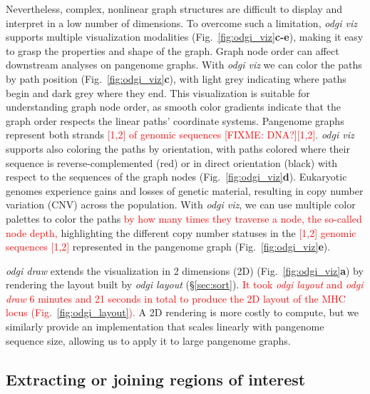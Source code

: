 \documentclass{bioinfo}
\newcommand{\red}[1]{{\textcolor{Red}{#1}}}
\newcommand{\FIXME}[1]{\red{[FIXME: #1]}}
\newcommand{\REVIEWED}[1]{{\textcolor{Red}{#1}}}
\begin{document}
Nevertheless, complex, nonlinear graph structures are difficult to display and interpret in a low number of dimensions.
To overcome such a limitation, \textit{odgi viz} supports multiple visualization modalities (Fig.~\ref{fig:odgi_viz}\textbf{c-e}), making it easy to grasp the properties and shape of the graph.
Graph node order can affect downstream analyses on pangenome graphs.
With \textit{odgi viz} we can color the paths by path position (Fig.~\ref{fig:odgi_viz}\textbf{c}), with light grey indicating where paths begin and dark grey where they end.
This visualization is suitable for understanding graph node order, as smooth color gradients indicate that the graph order respects the linear paths' coordinate systems.
Pangenome graphs represent both strands \REVIEWED{[1,2] of genomic sequences \FIXME{DNA?}[1,2]}.
\textit{odgi viz} supports also coloring the paths by orientation, with paths colored where their sequence is reverse-complemented (red) or in direct orientation (black) with respect to the sequences of the graph nodes (Fig.~\ref{fig:odgi_viz}\textbf{d}).
Eukaryotic genomes experience gains and losses of genetic material, resulting in copy number variation (CNV) across the population.
With \textit{odgi viz}, we can use multiple color palettes to color the paths \REVIEWED{by how many times they traverse a node, the so-called node depth,} highlighting the different copy number statuses in the \REVIEWED{[1,2] genomic sequences [1,2]} represented in the pangenome graph (Fig.~\ref{fig:odgi_viz}\textbf{e}).

\textit{odgi draw} extends the visualization in 2 dimensions (2D)  (Fig.~\ref{fig:odgi_viz}\textbf{a}) by rendering the layout built by \textit{odgi layout} (\S\ref{sec:sort}). \REVIEWED{It took \textit{odgi layout} and \textit{odgi draw} 6 minutes and 21 seconds in total to produce the 2D layout of the MHC locus (Fig.~\ref{fig:odgi_layout}).}
A 2D rendering is more costly to compute, but we similarly provide an implementation that scales linearly with pangenome sequence size, allowing us to apply it to large pangenome graphs.


\subsection{Extracting or joining regions of interest}
\label{sec:extract}
\end{document}
